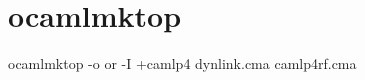 

\section{ocamlmktop}

\begin{bashcode}
ocamlmktop -o or -I +camlp4 dynlink.cma camlp4rf.cma
\end{bashcode}
